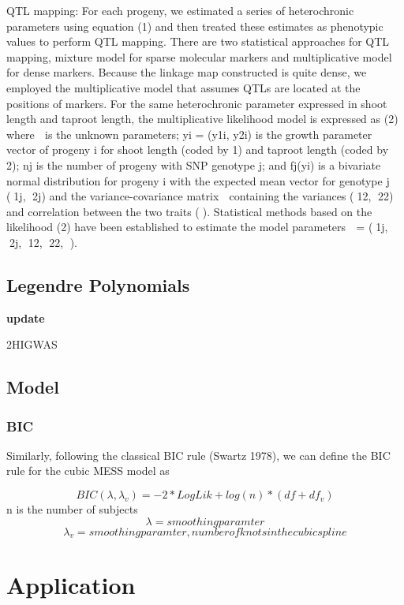 \documentclass[]{book}
\theoremstyle{definition}
\theoremstyle{definition}
\theoremstyle{remark}
\begin{document}
QTL mapping: For each progeny, we estimated a series of heterochronic
parameters using equation (1) and then treated these estimates as
phenotypic values to perform QTL mapping. There are two statistical
approaches for QTL mapping, mixture model for sparse molecular markers
and multiplicative model for dense markers. Because the linkage map
constructed is quite dense, we employed the multiplicative model that
assumes QTLs are located at the positions of markers. For the same
heterochronic parameter expressed in shoot length and taproot length,
the multiplicative likelihood model is expressed as (2) where  is the
unknown parameters; yi = (y1i, y2i) is the growth parameter vector of
progeny i for shoot length (coded by 1) and taproot length (coded by 2);
nj is the number of progeny with SNP genotype j; and fj(yi) is a
bivariate normal distribution for progeny i with the expected mean
vector for genotype j (1j, 2j) and the variance-covariance matrix 
containing the variances (12, 22) and correlation between the two
traits (). Statistical methods based on the likelihood (2) have been
established to estimate the model parameters  = (1j, 2j, 12, 22,
).

\subsection{Legendre Polynomials}\label{legendre-polynomials}

\textbf{update}

2HIGWAS \cite{jiang20152higwas}

\subsection{Model}\label{model}

\subsubsection{BIC}\label{bic}

Similarly, following the classical BIC rule (Swartz 1978), we can define
the BIC rule for the cubic MESS model as

\[BIC(\lambda, \lambda_v ) = -2*LogLik + log(n)*(df + df_v)\] n is the
number of subjects \cite{wu2006nonparametric}
\[\lambda = smoothing paramter\]
\[\lambda_v = smoothing paramter, number of knots in the cubic spline\]

\section{Application}\label{application-2}
\end{document}
